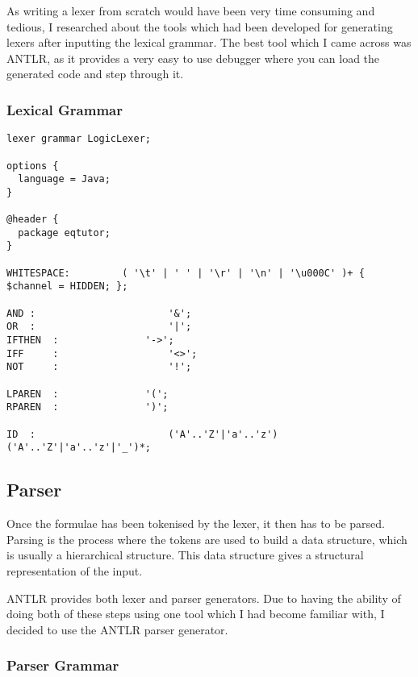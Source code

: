 \documentclass{report}
\begin{document}
As writing a lexer from scratch would have been very time consuming and tedious,
I researched about the tools which had been developed for generating lexers after
inputting the lexical grammar. The best tool which I came across was ANTLR, as it
provides a very easy to use debugger where you can load the generated code and step
through it. 

\subsubsection{Lexical Grammar}
\begin{verbatim}
lexer grammar LogicLexer;

options {
  language = Java;
}

@header {
  package eqtutor;
}

WHITESPACE:			( '\t' | ' ' | '\r' | '\n' | '\u000C' )+ { $channel = HIDDEN; };

AND	:						'&';
OR	:						'|';
IFTHEN	:				'->';
IFF 	:					'<>';
NOT 	:					'!';

LPAREN  :				'(';
RPAREN  :				')';

ID	:						('A'..'Z'|'a'..'z') ('A'..'Z'|'a'..'z'|'_')*;
\end{verbatim}

\subsection{Parser}

Once the formulae has been tokenised by the lexer, it then has to be parsed. Parsing
is the process where the tokens are used to build a data structure, which is usually
a hierarchical structure. This data structure gives a structural representation
of the input.

ANTLR provides both lexer and parser generators. Due to having the ability of doing both
of these steps using one tool which I had become familiar with, I decided to use the
ANTLR parser generator.


\subsubsection{Parser Grammar}
\end{document}

